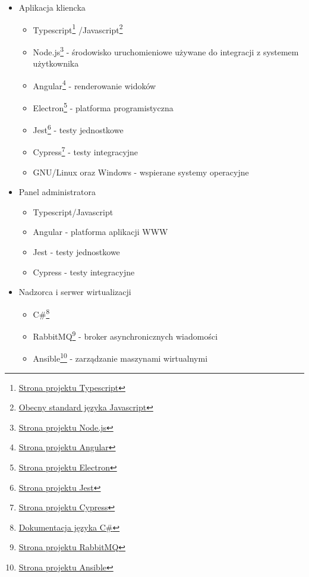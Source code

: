 \documentclass[../../deliverable-two.tex]{subfiles}
\begin{document}
\begin{itemize}
    \item Aplikacja kliencka
          \begin{itemize}
              \item Typescript\footnote{\href{https://www.typescriptlang.org}{Strona projektu Typescript}}
                    /Javascript\footnote{\href{https://www.ecma-international.org/publications-and-standards/standards/ecma-262}{Obecny standard języka Javascript}}
              \item Node.js\footnote{\href{https://nodejs.org/en}{Strona projektu Node.js}} - środowisko uruchomieniowe używane do integracji z systemem użytkownika
              \item Angular\footnote{\href{https://angular.io/}{Strona projektu Angular}} - renderowanie widoków
              \item Electron\footnote{\href{https://www.electronjs.org/}{Strona projektu Electron}} - platforma programistyczna
              \item Jest\footnote{\href{https://jestjs.io/}{Strona projektu Jest}} - testy jednostkowe
              \item Cypress\footnote{\href{https://www.cypress.io/}{Strona projektu Cypress}} - testy integracyjne
              \item GNU/Linux oraz Windows - wspierane systemy operacyjne
          \end{itemize}
    \item Panel administratora
          \begin{itemize}
              \item Typescript/Javascript
              \item Angular - platforma aplikacji WWW
              \item Jest - testy jednostkowe
              \item Cypress - testy integracyjne
          \end{itemize}
    \item Nadzorca i serwer wirtualizacji
          \begin{itemize}
              \item C\#\footnote{\href{https://docs.microsoft.com/en-us/dotnet/csharp/}{Dokumentacja języka C\#}}
              \item RabbitMQ\footnote{\href{https://www.rabbitmq.com/}{Strona projektu RabbitMQ}} - broker asynchronicznych wiadomości
              \item Ansible\footnote{\href{https://www.ansible.com/}{Strona projektu Ansible}} - zarządzanie maszynami wirtualnymi

\end{itemize}
\end{itemize}
\end{document}
